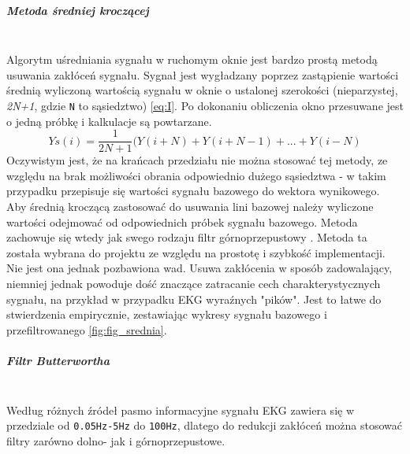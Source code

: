 \documentclass[a4paper, 11pt]{article}
\begin{document}
\subparagraph{Metoda średniej kroczącej}
\mbox{} \\
Algorytm uśredniania sygnału w ruchomym oknie jest bardzo prostą metodą usuwania zakłóceń sygnału. Sygnał jest wygładzany poprzez zastąpienie wartości średnią wyliczoną wartością sygnału w oknie o ustalonej szerokości (nieparzystej, \textit{2N+1}, gdzie \verb|N| to sąsiedztwo) \eqref{eq:I}. Po dokonaniu obliczenia okno przesuwane jest o jedną próbkę i kalkulacje są powtarzane. 
\begin{equation}
Ys(i) = \frac{1}{2N+1}(Y(i+N)+Y(i+N-1)+...+Y(i-N) \label{eq:I}
\end{equation}
Oczywistym jest, że na krańcach przedziału nie można stosować tej metody, ze względu na brak możliwości obrania odpowiednio dużego sąsiedztwa - w takim przypadku przepisuje się wartości sygnału bazowego do wektora wynikowego.\\
Aby średnią kroczącą zastosować do usuwania lini bazowej należy wyliczone wartości odejmować od odpowiednich próbek sygnału bazowego. Metoda zachowuje się wtedy jak swego rodzaju filtr górnoprzepustowy \cite{KAUR1}. Metoda ta została wybrana do projektu ze względu na prostotę i szybkość implementacji. Nie jest ona jednak pozbawiona wad. Usuwa zakłócenia w sposób zadowalający, niemniej jednak powoduje dość znaczące zatracanie cech charakterystycznych sygnału, na przykład w przypadku EKG wyraźnych "pików". Jest to łatwe do stwierdzenia empirycznie, zestawiając wykresy sygnału bazowego i przefiltrowanego \eqref{fig:fig_srednia}.

\subparagraph{Filtr Butterwortha}
\mbox{} \\
Według różnych źródeł \cite{JAGT1} pasmo informacyjne sygnału EKG zawiera się w przedziale od \verb|0.05Hz-5Hz| do \verb|100Hz|, dlatego do redukcji zakłóceń można stosować filtry zarówno dolno- jak i górnoprzepustowe.\\
\end{document}

